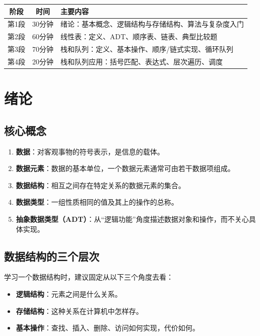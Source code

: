 \documentclass{../../note}
\begin{document}
\begin{center}
\begin{tabular}{|c|c|p{9cm}|}
\hline
阶段 & 时间 & 主要内容 \\
\hline
第1段 & 30分钟 & 绪论：基本概念、逻辑结构与存储结构、算法与复杂度入门 \\
\hline
第2段 & 60分钟 & 线性表：定义、ADT、顺序表、链表、典型比较题 \\
\hline
第3段 & 70分钟 & 栈和队列：定义、基本操作、顺序/链式实现、循环队列 \\
\hline
第4段 & 20分钟 & 栈和队列应用：括号匹配、表达式、层次遍历、调度 \\
\hline
\end{tabular}
\end{center}

\section{绪论}

\subsection{核心概念}

\begin{enumerate}
  \item \textbf{数据}：对客观事物的符号表示，是信息的载体。
  \item \textbf{数据元素}：数据的基本单位，一个数据元素通常可由若干数据项组成。
  \item \textbf{数据结构}：相互之间存在特定关系的数据元素的集合。
  \item \textbf{数据类型}：一组性质相同的值及其上的操作的总称。
  \item \textbf{抽象数据类型（ADT）}：从“逻辑功能”角度描述数据对象和操作，而不关心具体实现。
\end{enumerate}

\subsection{数据结构的三个层次}

学习一个数据结构时，建议固定从以下三个角度去看：

\begin{itemize}
  \item \textbf{逻辑结构}：元素之间是什么关系。
  \item \textbf{存储结构}：这种关系在计算机中怎样存。
  \item \textbf{基本操作}：查找、插入、删除、访问如何实现，代价如何。
\end{itemize}
\end{document}
